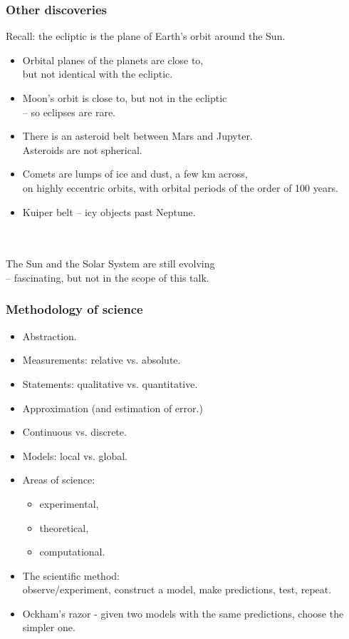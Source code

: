 \documentclass[aspectratio=169,xcolor=pdftex,dvipsnames]{beamer} %
\begin{document}
\begin{frame}
\frametitle{Other discoveries}

Recall: the ecliptic is the plane of Earth's orbit around the Sun.
\begin{itemize}
\item
Orbital planes of the planets are close to,\\ but not identical with the ecliptic.
\item
Moon's orbit is close to, but not in the ecliptic\\ -- so eclipses are rare.
\item
There is an asteroid belt between Mars and Jupyter.\\ Asteroids are not spherical.
\item
Comets are lumps of ice and dust, a few km across,\\ on highly eccentric orbits, with orbital periods of the order of 100 years.
\item
Kuiper belt -- icy objects past Neptune.
\end{itemize}
\ \\ \ \\
The Sun and the Solar System are still evolving\\
 -- fascinating, but not in the scope of this talk.

\end{frame}

\begin{frame}
\frametitle{Methodology of science}

\begin{itemize}
\item
Abstraction.
\item
Measurements: relative vs. absolute.
\item
Statements: qualitative vs. quantitative.
\item
Approximation (and estimation of error.)
\item
Continuous vs. discrete.
\item
Models: local  vs. global.
\item
Areas of science:
  \begin{itemize}
  \item
  experimental,
  \item
  theoretical,
  \item
  computational.
  \end{itemize}
  \item
The scientific method:\\ 
observe/experiment, construct a model, make predictions, test, repeat.
\item
Ockham's razor - given two models with the same predictions, choose the simpler one.
\end{itemize}

\end{frame}
\end{document}
